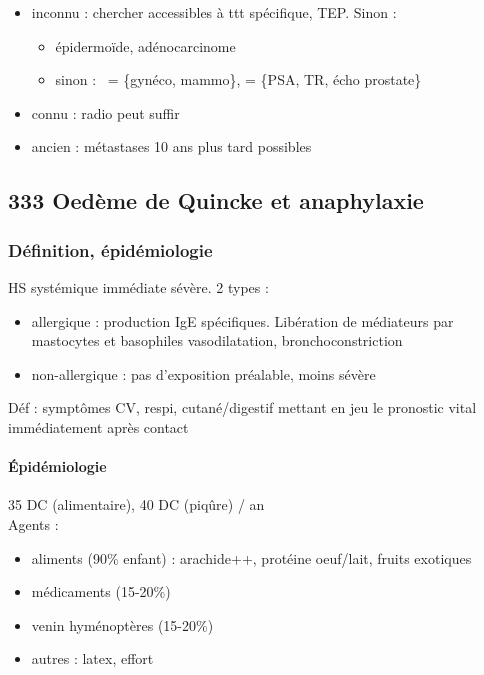 \documentclass[11pt]{article}
\begin{document}
\begin{itemize}
\item inconnu : chercher accessibles à ttt spécifique, TEP. Sinon :

\begin{itemize}
\item épidermoïde, adénocarcinome
\item sinon : \female{} = \{gynéco, mammo\}, \male{} = \{PSA, TR, écho prostate\}
\end{itemize}

\item connu : radio peut suffir
\item ancien : métastases 10 ans plus tard possibles
\end{itemize}

\subsection{333 \textdagger{} Oedème de Quincke et anaphylaxie}
\label{sec:org103deb5}
\label{sec:333_oedeme_de_quincke_et_anaphylaxie}

\subsubsection{Définition, épidémiologie}
\label{sec:orgaeab50f}
HS systémique immédiate sévère. 2 types :

\begin{itemize}
\item allergique : production IgE spécifiques. Libération de médiateurs par
mastocytes et basophiles \thus vasodilatation, bronchoconstriction
\item non-allergique : pas d'exposition préalable, moins sévère
\end{itemize}

Déf : symptômes CV, respi, cutané/digestif mettant en
jeu le pronostic vital immédiatement après contact

\paragraph{Épidémiologie}
\label{sec:org1258d1e}
35 DC (alimentaire), 40 DC (piqûre) / an\\
Agents :

\begin{itemize}
\item aliments (90\% enfant) : arachide++, protéine oeuf/lait, fruits exotiques
\item médicaments (15-20\%)
\item venin hyménoptères (15-20\%)
\item autres : latex, effort
\end{itemize}
\end{document}
